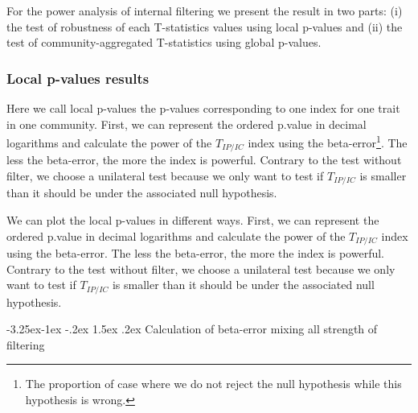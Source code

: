 \documentclass[12pt]{article}\usepackage[]{graphicx}\usepackage[]{color}
\makeatletter
\newcounter {subsubsubsection}[subsubsection]
\newcommand\subsubsubsection{\@startsection{subsubsubsection}{4}{\z@}%
          {-3.25ex\@plus -1ex \@minus -.2ex}%
          {1.5ex \@plus .2ex}%
          {\normalfont\normalsize\bfseries}}
\makeatother
\begin{document}
For the power analysis of internal filtering we present the result in two parts: (i) the test of robustness of each T-statistics values using local p-values and (ii) the test of community-aggregated T-statistics using global p-values.

 \subsubsection {Local p-values results}

Here we call local p-values the p-values corresponding to one index for one trait in one community. First, we can represent the ordered p.value in decimal logarithms and calculate the power of the $T_{IP/IC}$ index using the beta-error\footnote{The proportion of case where we do not reject the null hypothesis while this hypothesis is wrong.}. The less the beta-error, the more the index is powerful. Contrary to the test without filter, we choose a unilateral test because we only want to test if $T_{IP/IC}$ is smaller than it should be under the associated null hypothesis.

We can plot the local p-values in different ways. First, we can represent the ordered p.value in decimal logarithms and calculate the power of the $T_{IP/IC}$ index using the beta-error. The less the beta-error, the more the index is powerful. Contrary to the test without filter, we choose a unilateral test because we only want to test if $T_{IP/IC}$ is smaller than it should be under the associated null hypothesis.

  \subsubsubsection {Calculation of beta-error mixing all strength of filtering}
 
\end{document}
